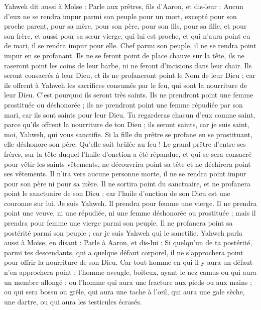 \begin{multicols}{2}
\VerseOne{}Yahweh dit aussi à Moïse : Parle aux prêtres, fils d'Aaron, et dis-leur : Aucun d'eux ne se rendra impur parmi son peuple pour un mort,
excepté pour son proche parent, pour sa mère, pour son père, pour son fils, pour sa fille, et pour son frère,
et aussi pour sa sœur vierge, qui lui est proche, et qui n'aura point eu de mari, il se rendra impur pour elle.
Chef parmi son peuple, il ne se rendra point impur en se profanant.
Ils ne se feront point de place chauve sur la tête, ils ne raseront point les coins de leur barbe, ni ne feront d'incisions dans leur chair.
Ils seront consacrés à leur Dieu, et ils ne profaneront point le Nom de leur Dieu ; car ils offrent à Yahweh les sacrifices consumés par le feu, qui sont la nourriture de leur Dieu. C'est pourquoi ils seront très saints.
Ils ne prendront point une femme prostituée ou déshonorée ; ils ne prendront point une femme répudiée par son mari, car ils sont saints pour leur Dieu.
Tu regarderas chacun d'eux comme saint, parce qu'ils offrent la nourriture de ton Dieu ; ils seront saints, car je suis saint, moi, Yahweh, qui vous sanctifie.
Si la fille du prêtre se profane en se prostituant, elle déshonore son père. Qu'elle soit brûlée au feu !
Le grand prêtre d'entre ses frères, sur la tête duquel l'huile d'onction a été répandue, et qui se sera consacré pour vêtir les saints vêtements, ne découvrira point sa tête et ne déchirera point ses vêtements.
Il n'ira vers aucune personne morte, il ne se rendra point impur pour son père ni pour sa mère.
Il ne sortira point du sanctuaire, et ne profanera point le sanctuaire de son Dieu ; car l'huile d'onction de son Dieu est une couronne sur lui. Je suis Yahweh.
Il prendra pour femme une vierge.
Il ne prendra point une veuve, ni une répudiée, ni une femme déshonorée ou prostituée ; mais il prendra pour femme une vierge parmi son peuple.
Il ne profanera point sa postérité parmi son peuple ; car je suis Yahweh qui le sanctifie.
Yahweh parla aussi à Moïse, en disant :
Parle à Aaron, et dis-lui : Si quelqu'un de ta postérité, parmi tes descendants, qui a quelque défaut corporel, il ne s'approchera point pour offrir la nourriture de son Dieu.
Car tout homme en qui il y aura un défaut n'en approchera point ; l'homme aveugle, boiteux, ayant le nez camus ou qui aura un membre allongé ;
ou l'homme qui aura une fracture aux pieds ou aux mains ;
ou qui sera bossu ou grêle, qui aura une tache à l'œil, qui aura une gale sèche, une dartre, ou qui aura les testicules écrasés.

\end{multicols}
